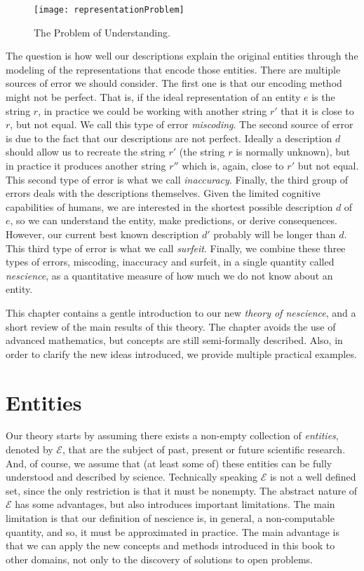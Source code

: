 \begin{figure}[h]
\centering\texttt{[image: representationProblem]}
\caption{\label{fig:representationProblem}The Problem of Understanding.}
\end{figure}

The question is how well our descriptions explain the original entities through the modeling of the representations that encode those entities. There are multiple sources of error we should consider. The first one is that our encoding method might not be perfect. That is, if the ideal representation of an entity $e$ is the string $r$, in practice we could be working with another string $r'$ that it is close to $r$, but not equal. We call this type of error \emph{miscoding}. The second source of error is due to the fact that our descriptions are not perfect. Ideally a description $d$ should allow us to recreate the string $r'$ (the string $r$ is normally unknown), but in practice it produces another string $r''$ which is, again, close to $r'$ but not equal. This second type of error is what we call \emph{inaccuracy}. Finally, the third group of errors deals with the descriptions themselves. Given the limited cognitive capabilities of humans, we are interested in the shortest possible description $d$ of $e$, so we can understand the entity, make predictions, or derive consequences. However, our current best known description $d'$ probably will be longer than $d$. This third type of error is what we call \emph{surfeit}. Finally, we combine these three types of errors, miscoding, inaccuracy and surfeit, in a single quantity called \emph{nescience}, as a quantitative measure of how much we do not know about an entity.

This chapter contains a gentle introduction to our new \emph{theory of nescience}, and a short review of the main results of this theory. The chapter avoids the use of advanced mathematics, but concepts are still semi-formally described. Also, in order to clarify the new ideas introduced, we provide multiple practical examples.

%
%

\section{Entities}

Our theory starts by assuming there exists a non-empty collection of \emph{entities}, denoted by $\mathcal{E}$, that are the subject of past, present or future scientific research. And, of course, we assume that (at least some of) these entities can be fully understood and described by science. Technically speaking $\mathcal{E}$ is not a well defined set, since the only restriction is that it must be nonempty. The abstract nature of $\mathcal{E}$ has some advantages, but also introduces important limitations. The main limitation is that our definition of nescience is, in general, a non-computable quantity, and so, it must be approximated in practice. The main advantage is that we can apply the new concepts and methods introduced in this book to other domains, not only to the discovery of solutions to open problems.

